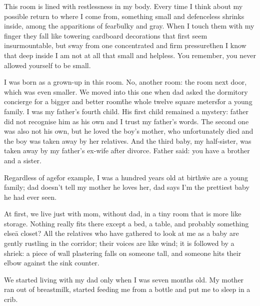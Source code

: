


\prelude

This room is lined with restlessness in my body. Every time I think
about my possible return to where I come from, something small and
defenceless shrinks inside, among the apparitions of fear\=bulky and
gray. When I touch them with my finger they fall like towering
cardboard decorations that first seem insurmountable, but sway from
one concentrated and firm pressure\=then I know that deep inside I am
not at all that small and helpless. You remember, you never allowed
yourself to be small.

\fugue

I was born as a grown-up in this room. No, another room: the room next
door, which was even smaller. We moved into this one when dad asked
the dormitory concierge for a bigger and better room\=the whole twelve
square meters\=for a young family. I was my father's fourth
child. His first child remained a mystery: father did not recognise
him as his own and I trust my father’s words. The second one was also
not his own, but he loved the boy’s mother, who unfortunately died and
the boy was taken away by her relatives. And the third baby, my
half-sister, was taken away by my father's ex-wife after
divorce. Father said: you have a brother and a sister.

Regardless of age\=for example, I was a hundred years old at
birth\=we are a young family; dad doesn't tell my mother he loves her, dad
says I'm the prettiest baby he had ever seen.

At first, we live just with mom, without dad, in a tiny room that is
more like storage.  Nothing really fits there except a bed, a table,
and probably something else\=a closet? All the relatives who have
gathered to look at me as a baby are gently rustling in the corridor;
their voices are like wind; it is followed by a shriek: a piece of
wall plastering falls on someone tall, and someone hits their elbow
against the sink counter.

We started living with my dad only when I was seven months old. My
mother ran out of breastmilk, started feeding me from a bottle and put
me to sleep in a crib.

